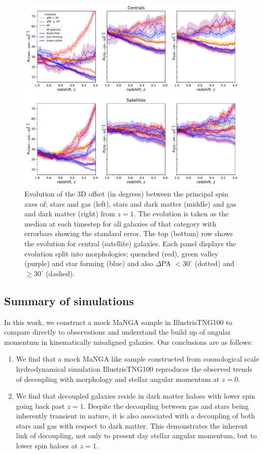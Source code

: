 \begin{figure}
	\includegraphics[width=\linewidth]{misalignment_TNG/3D_pa_evo_cen_sat.pdf}
    \caption{Evolution of the 3D offset (in degrees) between the principal spin axes of; stars and gas (left), stars and dark matter (middle) and gas and dark matter (right) from $z=1$. The evolution is taken as the median at each timestep for all galaxies of that category with errorbars showing the standard error. The top (bottom) row shows the evolution for central (satellite) galaxies. Each panel displays the evolution split into morphologies; quenched (red), green valley (purple) and star forming (blue) and also $\Delta$PA $< 30^{\circ}$ (dotted) and $\geq 30^{\circ}$ (dashed).}
    \label{fig:3D_alpha_evo}
\end{figure}

\subsection{Summary of simulations} \label{sec:tng_summary}
In this work, we construct a mock MaNGA sample in IllustrisTNG100 to compare directly to observations and understand the build up of angular momentum in kinematically misaligned galaxies. Our conclusions are as follows:
\begin{enumerate}
    \item We find that a mock MaNGA like sample constructed from cosmological scale hydrodynamical simulation IllustrisTNG100 reproduces the observed trends of decoupling with morphology and stellar angular momentum at $z=0$.
    
    \item We find that decoupled galaxies reside in dark matter haloes with lower spin going back past $z=1$. Despite the decoupling between gas and stars being inherently transient in nature, it is also associated with a decoupling of both stars and gas with respect to dark matter. This demonstrates the inherent link of decoupling, not only to present day stellar angular momentum, but to lower spin haloes at $z=1$. 

\end{enumerate}

